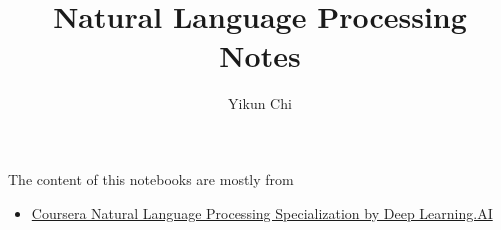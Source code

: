 \documentclass{book}
\title{Natural Language Processing Notes}
\author{Yikun Chi}
\begin{document}
\maketitle
\tableofcontents 

The content of this notebooks are mostly from 
    \begin{itemize}
        \item \href{https://www.coursera.org/specializations/natural-language-processing?utm_source=deeplearningai&utm_medium=institutions&utm_campaign=WebsiteCoursesNLPTopButton}{Coursera Natural Language Processing Specialization by Deep Learning.AI}
    \end{itemize}


\end{document}
